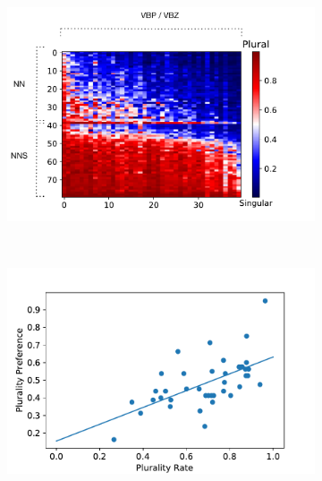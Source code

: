 \begin{figure}
    \centering
    \begin{subfigure}[b]{0.32\textwidth}
    \caption{}
        \includegraphics[width=\textwidth]{matrix_plot_ratio.pdf}
        \label{fig:matrix_ratio}
    \end{subfigure}
    ~ %
    \begin{subfigure}[b]{0.32\textwidth}
    	\caption{}
        \includegraphics[width=\textwidth]{lin_reg.pdf}
        \label{{fig:matrix_ratio}}
    \end{subfigure}
        \begin{subfigure}[b]{0.32\textwidth}
    	\caption{}

\end{subfigure}
\end{figure}
